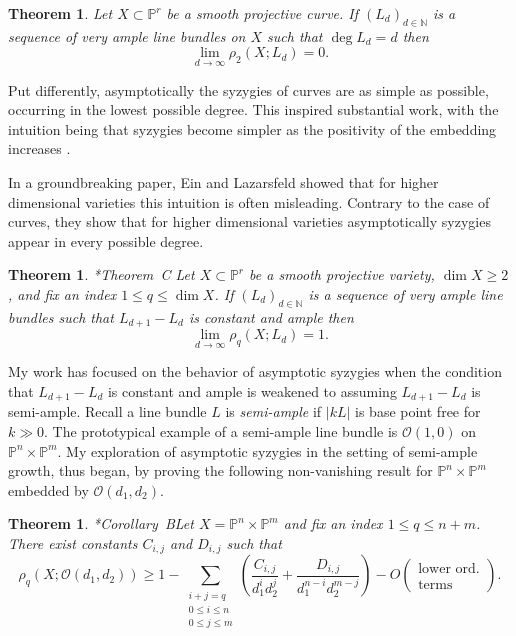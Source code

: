 \documentclass[11pt,reqno]{amsart}
\newtheorem{theorem}[lemma]{Theorem}
\theoremstyle{remark}
\renewcommand{\O}{\mathcal{O}}
\newcommand{\N}{\mathbb{N}}
\renewcommand{\P}{\mathbb{P}}
\begin{document}
\begin{theorem}\cite{green84-I}
Let $X\subset \P^r$ be a smooth projective curve. If $(L_{d})_{d\in\N}$ is a sequence of very ample line bundles on $X$ such that $\deg L_{d} = d$ then 
\[
\lim_{d\to \infty} \rho_{2}\left(X;L_{d}\right) = 0.
\]
\end{theorem}

Put differently, asymptotically the syzygies of curves are as simple as possible, occurring in the lowest possible degree. This inspired substantial work, with the intuition being that syzygies become simpler as the positivity of the embedding increases \cite{ottavianiPaoletti01, einLazarsfeld93, lazarsfeldPareschiPopa11, pareschi00, pareschiPopa03, pareschiPopa04}.  

In a groundbreaking paper, Ein and Lazarsfeld showed that for higher dimensional varieties this intuition is often misleading. Contrary to the case of curves, they show that for higher dimensional varieties  asymptotically syzygies appear in every possible degree. 
  
\begin{theorem}\cite{einLazarsfeld12}*{Theorem~C}
Let $X\subset \P^r$ be a smooth projective variety, $\dim X \geq2$, and fix an index $1\leq q \leq \dim X$. If $(L_{d})_{d\in\N}$ is a sequence of very ample line bundles such that $L_{d+1}-L_{d}$ is constant and ample then
\[
\lim_{d\to\infty} \rho_{q}\left(X; L_d\right) = 1.
\]
\end{theorem}

My work has focused on the behavior of asymptotic syzygies when the condition that $L_{d+1}-L_{d}$ is constant and ample is weakened to assuming $L_{d+1}-L_{d}$ is semi-ample. Recall a line bundle $L$ is \textit{semi-ample} if $|kL|$ is base point free for $k\gg0$. The prototypical example of a semi-ample line bundle is $\O(1,0)$ on $\P^{n}\times \P^{m}$. My exploration of asymptotic syzygies in the setting of semi-ample growth, thus began, by proving the following non-vanishing result for $\P^{n}\times\P^{m}$ embedded by $\O(d_{1},d_{2})$. 

\begin{theorem}\cite{bruce19-semiample}*{Corollary~B}\label{thm:bruce-semiample}
Let $X=\P^{n}\times\P^{m}$ and fix an index $1\leq q \leq n+m$. There exist constants $C_{i,j}$ and $D_{i,j}$ such that
\[
\rho_{q}\left(X; \O\left(d_1,d_2\right)\right)\geq1-\sum_{\substack{i+j=q \\ 0\leq i \leq n \\ 0\leq j \leq m}}\left(
\frac{C_{i,j}}{d_1^id_2^j}+\frac{D_{i,j}}{d_1^{n-i}d_2^{m-j}}\right)-O\left(\begin{matrix}\text{lower ord.}\\ \text{terms}\end{matrix}\right).
\]
\end{theorem}
\end{document}
